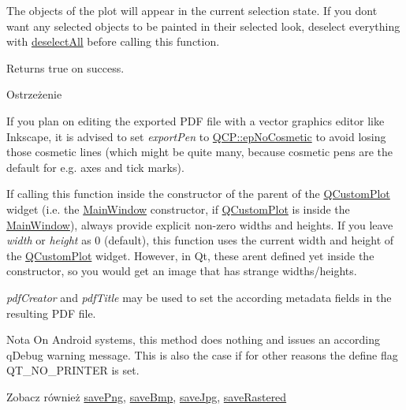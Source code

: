 The objects of the plot will appear in the current selection state. If you don\textquotesingle{}t want any selected objects to be painted in their selected look, deselect everything with \hyperlink{class_q_custom_plot_a9d4808ab925b003054085246c92a257c}{deselect\+All} before calling this function.

Returns true on success.

\begin{DoxyWarning}{Ostrzeżenie}
\begin{DoxyItemize}
\item If you plan on editing the exported P\+DF file with a vector graphics editor like Inkscape, it is advised to set {\itshape export\+Pen} to \hyperlink{namespace_q_c_p_a17844f19e1019693a953e1eb93536d2faae8fcfaafee234ce18558afef83f6a78}{Q\+C\+P\+::ep\+No\+Cosmetic} to avoid losing those cosmetic lines (which might be quite many, because cosmetic pens are the default for e.\+g. axes and tick marks). \item If calling this function inside the constructor of the parent of the \hyperlink{class_q_custom_plot}{Q\+Custom\+Plot} widget (i.\+e. the \hyperlink{class_main_window}{Main\+Window} constructor, if \hyperlink{class_q_custom_plot}{Q\+Custom\+Plot} is inside the \hyperlink{class_main_window}{Main\+Window}), always provide explicit non-\/zero widths and heights. If you leave {\itshape width} or {\itshape height} as 0 (default), this function uses the current width and height of the \hyperlink{class_q_custom_plot}{Q\+Custom\+Plot} widget. However, in Qt, these aren\textquotesingle{}t defined yet inside the constructor, so you would get an image that has strange widths/heights.\end{DoxyItemize}
{\itshape pdf\+Creator} and {\itshape pdf\+Title} may be used to set the according metadata fields in the resulting P\+DF file.
\end{DoxyWarning}
\begin{DoxyNote}{Nota}
On Android systems, this method does nothing and issues an according q\+Debug warning message. This is also the case if for other reasons the define flag {\ttfamily Q\+T\+\_\+\+N\+O\+\_\+\+P\+R\+I\+N\+T\+ER} is set.
\end{DoxyNote}
\begin{DoxySeeAlso}{Zobacz również}
\hyperlink{class_q_custom_plot_ac92cc9256d12f354b40a4be4600b5fb9}{save\+Png}, \hyperlink{class_q_custom_plot_ae3a86ed0795670e50afa21759d4fa13d}{save\+Bmp}, \hyperlink{class_q_custom_plot_a76f0d278e630a711fa6f48048cfd83e4}{save\+Jpg}, \hyperlink{class_q_custom_plot_ad7723ce2edfa270632ef42b03a444352}{save\+Rastered} 
\end{DoxySeeAlso}
